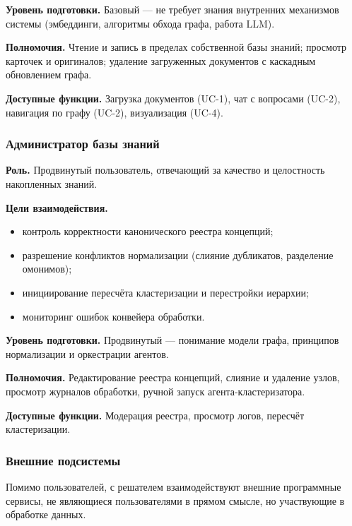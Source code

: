 \textbf{Уровень подготовки.} Базовый --- не требует знания внутренних механизмов системы (эмбеддинги, алгоритмы обхода графа, работа LLM).

\textbf{Полномочия.} Чтение и запись в пределах собственной базы знаний; просмотр карточек и оригиналов; удаление загруженных документов с каскадным обновлением графа.

\textbf{Доступные функции.} Загрузка документов (UC-1), чат с вопросами (UC-2), навигация по графу (UC-2), визуализация (UC-4).

\subsubsection{Администратор базы знаний}

\textbf{Роль.} Продвинутый пользователь, отвечающий за качество и целостность накопленных знаний.

\textbf{Цели взаимодействия.}
\begin{itemize}
    \item контроль корректности канонического реестра концепций;
    \item разрешение конфликтов нормализации (слияние дубликатов, разделение омонимов);
    \item инициирование пересчёта кластеризации и перестройки иерархии;
    \item мониторинг ошибок конвейера обработки.
\end{itemize}

\textbf{Уровень подготовки.} Продвинутый --- понимание модели графа, принципов нормализации и оркестрации агентов.

\textbf{Полномочия.} Редактирование реестра концепций, слияние и удаление узлов, просмотр журналов обработки, ручной запуск агента-кластеризатора.

\textbf{Доступные функции.} Модерация реестра, просмотр логов, пересчёт кластеризации.

\subsubsection{Внешние подсистемы}

Помимо пользователей, с решателем взаимодействуют внешние программные сервисы, не являющиеся пользователями в прямом смысле, но участвующие в обработке данных.

